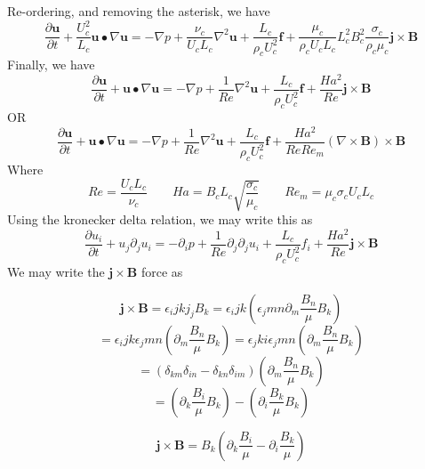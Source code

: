 \documentclass[11pt]{article}
\newcommand{\B}{\mathbf{B}}
\renewcommand{\U}{\mathbf{u}}
\newcommand{\PD}{\partial}
\newcommand{\J}{\mathbf{j}}
\newcommand{\F}{\mathbf{f}}
\begin{document}
Re-ordering, and removing the asterisk, we have
\begin{equation}
	\frac{\PD \U}{\PD t} + \frac{U_c^2}{L_c} \U \bullet \nabla \U =
	- \nabla  p +
	\frac{\nu_c}{U_c L_c} {\nabla}^2 \U + \frac{L_c}{\rho_c U_c^2} \F +
	\frac{\mu_c}{\rho_c U_c L_c}
	L_c^2 B_c^2 \frac{\sigma_c}{\rho_c \mu_c}
	\J \times \B
\end{equation}
Finally, we have
\begin{equation}
	\boxed{
	\frac{\PD \U}{\PD t} + \U \bullet \nabla \U =
	-\nabla  p +
	\frac{1}{Re} {\nabla}^2 \U + \frac{L_c}{\rho_c U_c^2} \F +
	\frac{Ha^2}{Re} \J \times \B
	}
\end{equation}
OR
\begin{equation}
	\boxed{
	\frac{\PD \U}{\PD t} + \U \bullet \nabla \U =
	-\nabla  p +
	\frac{1}{Re} {\nabla}^2 \U + \frac{L_c}{\rho_c U_c^2} \F +
	\frac{Ha^2}{Re Re_m} (\nabla \times \B) \times \B
	}
\end{equation}
Where
\begin{equation}
	Re = \frac{U_c L_c}{\nu_c} \qquad
	Ha = B_c L_c \sqrt{\frac{\sigma_c}{\mu_c}} \qquad
	Re_m = \mu_c \sigma_c U_c L_c
\end{equation}
	Using the kronecker delta relation, we may write this as
\begin{equation}
	\frac{\PD u_i }{\PD t} + u_j \PD_j u_i =
	-\PD_i  p +
	\frac{1}{Re} \PD_j \PD_j u_i +
	\frac{L_c}{\rho_c U_c^2} f_i +
	\frac{Ha^2}{Re} \J \times \B
\end{equation}
We may write the $\J\times \B$ force as

\begin{equation}
	\J\times \B = \epsilon_ijk j_j B_k =
	\epsilon_ijk \left( \epsilon_jmn \PD_m \frac{B_n}{\mu} B_k \right)
\end{equation}
\begin{equation}
	= \epsilon_ijk \epsilon_jmn \left( \PD_m \frac{B_n}{\mu} B_k \right)
	= \epsilon_jki \epsilon_jmn \left( \PD_m \frac{B_n}{\mu} B_k \right)
\end{equation}
\begin{equation}
	= (\delta_{km} \delta_{in} - \delta_{kn} \delta_{im} ) \left( \PD_m \frac{B_n}{\mu} B_k \right)
\end{equation}
\begin{equation}
	= \left( \PD_k \frac{B_i}{\mu} B_k \right) -
	\left( \PD_i \frac{B_k}{\mu} B_k \right)
\end{equation}

\begin{equation}
	\J \times \B = B_k
	\left( \PD_k \frac{B_i}{\mu} - \PD_i \frac{B_k}{\mu} \right)
\end{equation}
\end{document}
